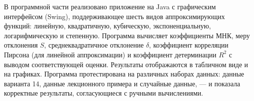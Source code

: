 В программной части реализовано приложение на Java с графическим интерфейсом (Swing), поддерживающее шесть видов аппроксимирующих функций: линейную, квадратичную, кубическую, экспоненциальную, логарифмическую и степенную. Программа вычисляет коэффициенты МНК, меру отклонения $S$, среднеквадратичное отклонение $\delta$, коэффициент корреляции Пирсона (для линейной аппроксимации) и коэффициент детерминации $R^2$ с выводом соответствующей оценки. Результаты отображаются в табличном виде и на графиках. Программа протестирована на различных наборах данных: данные варианта 14, данные лекционного примера и случайные данные, — и показала корректные результаты, согласующиеся с ручными вычислениями.
